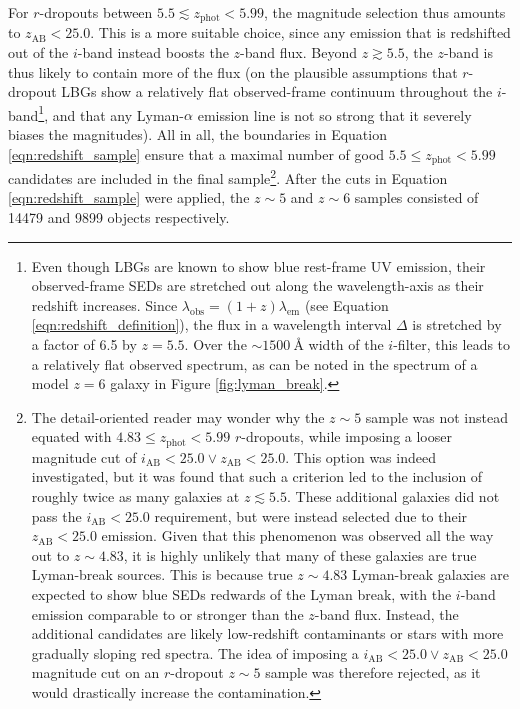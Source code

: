 \noindent For $r$-dropouts between $5.5 \lesssim z_{\mathrm{phot}} <  5.99$, the magnitude selection thus amounts to $z_{\mathrm{AB}}<25.0$. This is a more suitable choice, since any emission that is redshifted out of the $i$-band instead boosts the $z$-band flux. Beyond $z\gtrsim5.5$, the $z$-band is thus likely to contain more of the flux (on the plausible assumptions that $r$-dropout LBGs show a relatively flat observed-frame continuum throughout the $i$-band\footnote{Even though LBGs are known to show blue rest-frame UV emission, their observed-frame SEDs are stretched out along the wavelength-axis as their redshift increases. Since $\lambda_{\mathrm{obs}}=(1+z)\lambda_{\mathrm{em}}$ (see Equation  \ref{eqn:redshift_definition}), the flux in a wavelength interval $\Delta$ is stretched by a factor of 6.5 by $z=5.5$. Over the $\sim \SI{1500}{\angstrom}$ width of the $i$-filter, this leads to a relatively flat observed spectrum, as can be noted in the spectrum of a model $z=6$ galaxy in Figure \ref{fig:lyman_break}.}, and that any Lyman-$\alpha$ emission line is not so strong that it severely biases the magnitudes). All in all, the boundaries in Equation \ref{eqn:redshift_sample} ensure that a maximal number of good $5.5 \leq z_{\mathrm{phot}} < 5.99$ candidates are included in the final sample\footnote{The detail-oriented reader may wonder why the $z\sim5$ sample was not instead equated with $4.83 \leq z_{\mathrm{phot}} <  5.99$ $r$-dropouts, while imposing a looser magnitude cut of $i_{\mathrm{AB}}< 25.0 \lor z_{\mathrm{AB}}< 25.0$. This option was indeed investigated, but it was found that such a criterion led to the inclusion of roughly twice as many galaxies at $z\lesssim 5.5$. These additional galaxies did not pass the $i_{\mathrm{AB}}< 25.0$ requirement, but were instead selected due to their $z_{\mathrm{AB}}< 25.0$ emission. Given that this phenomenon was observed all the way out to $z\sim 4.83$, it is highly unlikely that many of these galaxies are true Lyman-break sources. This is because true $z\sim 4.83$ Lyman-break galaxies are expected to show blue SEDs redwards of the Lyman break, with the $i$-band emission comparable to or stronger than the $z$-band flux. Instead, the additional candidates are likely low-redshift contaminants or stars with more gradually sloping red spectra. The idea of imposing a $i_{\mathrm{AB}}< 25.0 \lor z_{\mathrm{AB}}< 25.0$ magnitude cut on an $r$-dropout $z\sim5$ sample was therefore rejected, as it would drastically increase the contamination.}. After the cuts in Equation \ref{eqn:redshift_sample} were applied, the $z\sim5$ and $z\sim6$ samples consisted of \num{14479} and 9899 objects respectively. \par 



